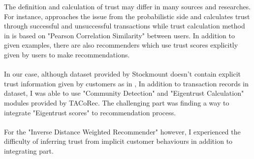 The definition and calculation of trust may differ in many sources and researches. For instance, \cite{Eigentrust} approaches the issue from the probabilistic side and calculates trust through successful and unsuccessful transactions while trust calculation method in \cite{papagelis_article} is based on "Pearson Correlation Similarity" between users. In addition to given examples, there are also recommenders\cite{massa_article} which use trust scores explicitly given by users to make recommendations. \\ \\
In our case, although dataset provided by Stockmount doesn't contain explicit trust information given by customers as in \cite{massa_article}, In addition to transaction records in dataset, I was able to use "Community Detection" and "Eigentrust Calculation" modules provided by TACoRec\cite{Tacorec}. The challenging part was finding a way to integrate "Eigentrust scores" to recommendation process. \\ \\
For the "Inverse Distance Weighted Recommender" however, I experienced the difficulty of inferring trust from implicit customer behaviours in addition to integrating part. 